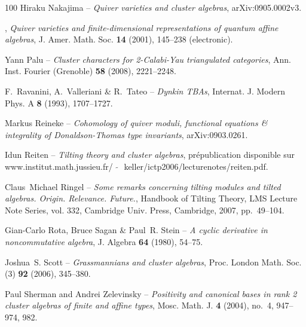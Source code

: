 \documentclass[brochure,12pt]{bourbaki}
\numberwithin{equation}{subsection}
\numberwithin{theorem}{section}
\begin{document}
\begin{thebibliography}{100}
{\sc Hiraku Nakajima} -- \emph{Quiver varieties and cluster algebras},
  arXiv:0905.0002v3.

\bysame, \emph{Quiver varieties and finite-dimensional representations of
  quantum affine algebras}, J. Amer. Math. Soc. \textbf{14} (2001), 
  145--238 (electronic).

{\sc Yann Palu} -- \emph{Cluster characters for 2-{C}alabi-{Y}au triangulated
  categories}, Ann. Inst. Fourier (Grenoble) \textbf{58} (2008), 
  2221--2248.
  
  \smallskip

{\sc F.~Ravanini, A.~Valleriani \& R.~Tateo} -- \emph{Dynkin {TBA}s}, Internat. J.
  Modern Phys. A \textbf{8} (1993), 1707--1727.
 
  \smallskip


{\sc Markus Reineke} -- \emph{Cohomology of quiver moduli, functional equations \&
  integrality of {Donaldson-Thomas} type invariants}, arXiv:0903.0261.
 
  \smallskip


{\sc Idun Reiten} -- \emph{Tilting theory and cluster algebras}, pr\'epublication disponible sur
  www.institut.math.jussieu.fr/ $\widetilde{\mbox{ }}$
  keller/ictp2006/lecturenotes/reiten.pdf.
 
  \smallskip


{\sc Claus~Michael Ringel} -- \emph{Some remarks concerning tilting modules and tilted
  algebras. {Origin. Relevance. Future.}}, Handbook of Tilting Theory, LMS
  Lecture Note Series, vol. 332, Cambridge Univ. Press, Cambridge, 2007,
  pp.~49--104.
 
  \smallskip


{\sc Gian-Carlo Rota, Bruce Sagan \& Paul~R. Stein} -- \emph{A cyclic derivative in
  noncommutative algebra}, J. Algebra \textbf{64} (1980), 54--75.
 
  \smallskip


{\sc Joshua~S. Scott} -- \emph{Grassmannians and cluster algebras}, Proc. London Math.
  Soc. (3) \textbf{92} (2006), 345--380.
 
   

{\sc Paul Sherman and Andrei Zelevinsky} -- \emph{Positivity and canonical bases in
  rank 2 cluster algebras of finite and affine types}, Mosc. Math. J.
  \textbf{4} (2004), no.~4, 947--974, 982.



\end{thebibliography}
\end{document}
